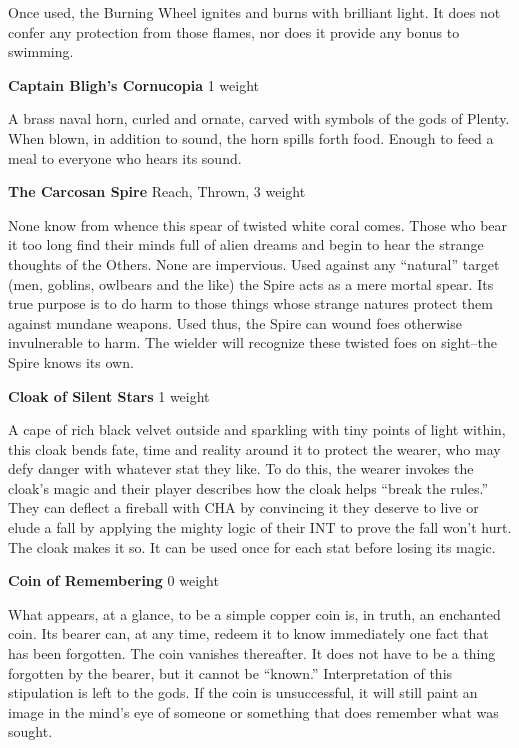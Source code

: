 Once used, the Burning Wheel ignites and burns with brilliant light. It does not confer any protection from those flames, nor does it provide any bonus to swimming.

{\noindent \bfseries Captain Bligh's Cornucopia} \hspace*{\fill} 1 weight

A brass naval horn, curled and ornate, carved with symbols of the gods of Plenty. When blown, in addition to sound, the horn spills forth food. Enough to feed a meal to everyone who hears its sound.

{\noindent \bfseries The Carcosan Spire} \hspace*{\fill} Reach, Thrown, 3 weight

None know from whence this spear of twisted white coral comes. Those who bear it too long find their minds full of alien dreams and begin to hear the strange thoughts of the Others. None are impervious. Used against any ``natural'' target (men, goblins, owlbears and the like) the Spire acts as a mere mortal spear. Its true purpose is to do harm to those things whose strange natures protect them against mundane weapons. Used thus, the Spire can wound foes otherwise invulnerable to harm. The wielder will recognize these twisted foes on sight--the Spire knows its own.

{\noindent \bfseries Cloak of Silent Stars} \hspace*{\fill} 1 weight

A cape of rich black velvet outside and sparkling with tiny points of light within, this cloak bends fate, time and reality around it to protect the wearer, who may defy danger with whatever stat they like. To do this, the wearer invokes the cloak's magic and their player describes how the cloak helps ``break the rules.'' They can deflect a fireball with CHA by convincing it they deserve to live or elude a fall by applying the mighty logic of their INT to prove the fall won't hurt. The cloak makes it so. It can be used once for each stat before losing its magic.

{\noindent \bfseries Coin of Remembering} \hspace*{\fill} 0 weight

What appears, at a glance, to be a simple copper coin is, in truth, an enchanted coin. Its bearer can, at any time, redeem it to know immediately one fact that has been forgotten. The coin vanishes thereafter. It does not have to be a thing forgotten by the bearer, but it cannot be ``known.'' Interpretation of this stipulation is left to the gods. If the coin is unsuccessful, it will still paint an image in the mind's eye of someone or something that does remember what was sought.

